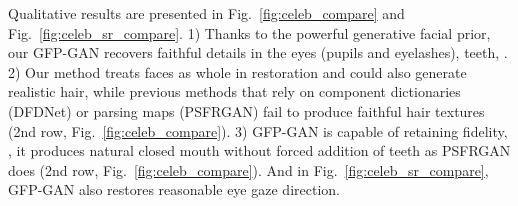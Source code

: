 \documentclass[final]{cvpr}
\begin{document}
\begin{table}[th]
	\small
	\centering
	\caption{Quantitative comparison on \textbf{CelebA-Test} for  face super-resolution.  and  indicates the best and the second best performance.  `*' denotes finetuning on our training set. Deg. represents the identity distance.}
	\vspace{-0.3cm}
	\label{tab:celeba_sr}
	\tabcolsep=0.1cm
	\vspace{-0.5cm}
\end{table}

Qualitative results are presented in Fig.~\ref{fig:celeb_compare} and Fig.~\ref{fig:celeb_sr_compare}. 1) Thanks to the powerful generative facial prior, our GFP-GAN recovers faithful details in the eyes (pupils and eyelashes), teeth, \etc. 2) Our method treats faces as whole in restoration and could also generate realistic hair, while previous methods that rely on component dictionaries (DFDNet) or parsing maps (PSFRGAN) fail to produce faithful hair textures (2nd row, Fig.~\ref{fig:celeb_compare}). 3) GFP-GAN is capable of retaining fidelity, \eg, it produces natural closed mouth  without forced addition of teeth as PSFRGAN does (2nd row, Fig.~\ref{fig:celeb_compare}). And in Fig.~\ref{fig:celeb_sr_compare}, GFP-GAN also restores reasonable eye gaze direction.
\end{document}
